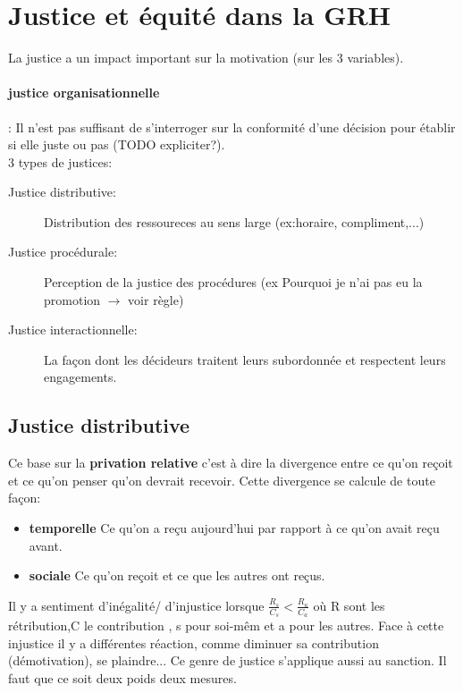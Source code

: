 \documentclass[11pt]{article} %
\begin{document}
\section{Justice et équité dans la GRH}
	La justice a un impact important sur la motivation (sur les 3 variables).
	\paragraph{justice organisationnelle}: Il n'est pas suffisant de s'interroger sur la conformité d'une décision 
	pour établir si elle juste ou pas (TODO expliciter?).\\
	3 types de justices: 
	\begin{description}
		\item[Justice distributive:] Distribution des ressoureces au sens large (ex:horaire, compliment,...)
		\item[Justice procédurale:] Perception de la justice des procédures (ex Pourquoi je n'ai pas eu la 
		promotion $\to$ voir règle)
		\item[Justice interactionnelle:] La façon dont les décideurs traitent leurs subordonnée et respectent 
		leurs engagements.
	\end{description}
	\subsection{Justice distributive}
		Ce base sur la \textbf{privation relative} c'est à dire la divergence entre ce qu'on reçoit et ce qu'on 
		penser qu'on devrait recevoir. Cette divergence se calcule de toute façon:
		\begin{itemize}
			\item \textbf{temporelle} Ce qu'on a reçu aujourd'hui par rapport à ce qu'on avait reçu avant.
			\item \textbf{sociale} Ce qu'on reçoit et ce que les autres ont reçus.
		\end{itemize}
		Il y a sentiment d'inégalité/ d'injustice  lorsque $\frac{R_s}{C_s}<\frac{R_a}{C_a}$ où R sont les 
		rétribution,C le contribution , s pour soi-mêm et a pour les autres. Face à cette injustice il y a 
		différentes réaction, comme diminuer sa contribution (démotivation), se plaindre... Ce genre de justice 
		s'applique aussi au sanction. Il faut que ce soit deux poids deux mesures.
\end{document}
